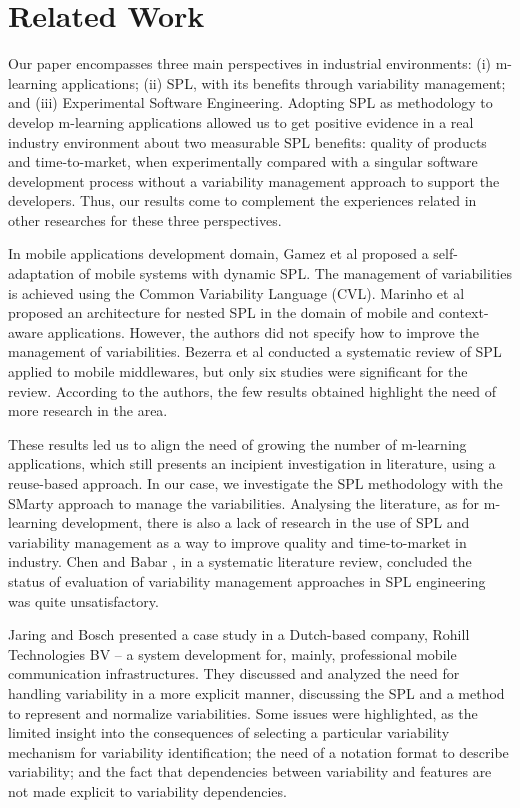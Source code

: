\section{Related Work} \label{section5}

Our paper encompasses three main perspectives in industrial environments: (i) m-learning applications; (ii) SPL, with its benefits through variability management; and (iii) Experimental Software Engineering. Adopting SPL as methodology to develop m-learning applications allowed us to get positive evidence in a real industry environment about two measurable SPL benefits: quality of products and time-to-market, when experimentally compared with a singular software development process without a variability management approach to support the developers. Thus, our results come to complement the experiences related in other researches for these three perspectives.

In mobile applications development domain, Gamez et al \cite{gamez14} proposed a self-adaptation of mobile systems with dynamic SPL. The management of variabilities is achieved using the Common Variability Language (CVL). Marinho et al \cite{marinho10} proposed an architecture for nested SPL in the domain of mobile and context-aware applications. However, the authors did not specify how to improve the management of variabilities. Bezerra et al \cite{bezerra09} conducted a systematic review of SPL applied to mobile middlewares, but only six studies were significant for the review. According to the authors, the few results obtained highlight the need of more research in the area. 

These results led us to align the need of growing the number of m-learning applications, which still presents an incipient investigation in literature, using a reuse-based approach. In our case, we investigate the SPL methodology with the SMarty approach to manage the variabilities. Analysing the literature, as for m-learning development, there is also a lack of research in the use of SPL and variability management as a way to improve quality and time-to-market in industry. Chen and Babar \cite{chen11}, in a systematic literature review, concluded the status of evaluation of variability management approaches in SPL engineering was quite unsatisfactory. 

Jaring and Bosch \cite{jaring02} presented a case study in a Dutch-based company, Rohill Technologies BV -- a system development for, mainly, professional mobile communication infrastructures. They discussed and analyzed the need for handling variability in a more explicit manner, discussing the SPL and a method to represent and normalize variabilities. Some issues were highlighted, as the limited insight into the consequences of selecting a particular variability mechanism for variability identification; the need of a notation format to describe variability; and the fact that dependencies between variability and features are not made explicit to variability dependencies.

